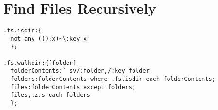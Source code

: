 \section{Find Files Recursively}

\begin{verbatim}
.fs.isdir:{
  not any (();x)~\:key x
  };

.fs.walkdir:{[folder]
  folderContents:` sv/:folder,/:key folder;
  folders:folderContents where .fs.isdir each folderContents;
  files:folderContents except folders;
  files,.z.s each folders
  };
\end{verbatim}

\clearpage
